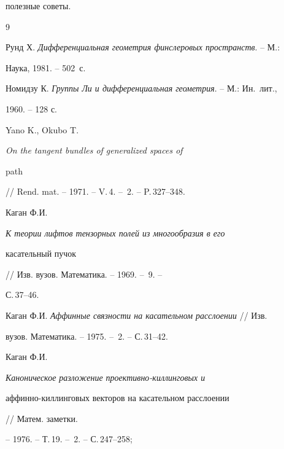 полезные советы. 


 


 


\begin{thebibliography}{9} 


 




Рунд Х. {\em Дифференциальная геометрия финслеровых пространств}. -- М.: 


Наука, 1981. -- 502~с. 




Номидзу К. {\em Группы Ли и дифференциальная геометрия}. -- М.: Ин.~лит., 


1960. -- 128 с. 




Yano K., Okubo T. {\em On the tangent bundles of generalized spaces of 


path} // Rend. mat. -- 1971. -- V.\,4. -- \No\,2. -- P.\,327--348. 




Каган Ф.И. {\em К теории лифтов тензорных полей из многообразия в его 


касательный пучок} // Изв. вузов. Математика. -- 1969. -- \No\,9. -- 


С.\,37--46. 




Каган Ф.И. {\em Аффинные связности на касательном расслоении} // Изв. 


вузов. Математика. -- 1975. -- \No\,2. -- С.\,31--42. 




Каган Ф.И. {\em Каноническое разложение проективно-киллинговых и 


аффинно-киллинговых векторов на касательном расслоении} // Матем. заметки. 


-- 1976. -- Т.\,19. -- \No\,2. -- С.\,247--258; 


 


 


\end{thebibliography} 


 


\vskip 2cm 


 






 


 


